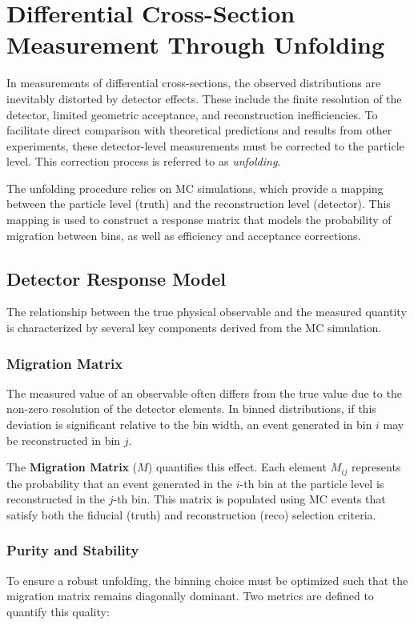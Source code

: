 \section{Differential Cross-Section Measurement Through Unfolding}
\label{sec:llvv_unfolding}

In measurements of differential cross-sections, the observed distributions are inevitably distorted by detector effects. These include the finite resolution of the detector, limited geometric acceptance, and reconstruction inefficiencies. To facilitate direct comparison with theoretical predictions and results from other experiments, these detector-level measurements must be corrected to the particle level. This correction process is referred to as \textit{unfolding}.

The unfolding procedure relies on MC simulations, which provide a mapping between the particle level (truth) and the reconstruction level (detector). This mapping is used to construct a response matrix that models the probability of migration between bins, as well as efficiency and acceptance corrections.

\subsection{Detector Response Model}

The relationship between the true physical observable and the measured quantity is characterized by several key components derived from the MC simulation.

\subsubsection{Migration Matrix}
The measured value of an observable often differs from the true value due to the non-zero resolution of the detector elements. In binned distributions, if this deviation is significant relative to the bin width, an event generated in bin $i$ may be reconstructed in bin $j$.

The \textbf{Migration Matrix} ($M$) quantifies this effect. Each element $M_{ij}$ represents the probability that an event generated in the $i$-th bin at the particle level is reconstructed in the $j$-th bin. This matrix is populated using MC events that satisfy both the fiducial (truth) and reconstruction (reco) selection criteria.

\subsubsection{Purity and Stability}
To ensure a robust unfolding, the binning choice must be optimized such that the migration matrix remains diagonally dominant. Two metrics are defined to quantify this quality:

